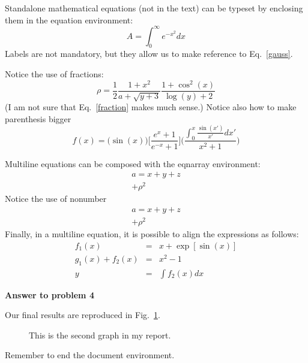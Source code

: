 \documentclass[12pt,dvips]{article}
\begin{document}
Standalone mathematical equations (not in the text) can be
typeset by enclosing them in the equation environment:
\begin{equation}
A = \int_0^\infty e^{-x^2} dx
\label{gauss}
\end{equation}
Labels are not mandatory, but they allow us to make reference
to Eq.~\ref{gauss}.

Notice the use of fractions:
\begin{equation}
\rho=\frac{1}{2} \frac{1+x^2}{a+\sqrt{y+3}} \frac{1+\cos^2(x)}{\log(y)+2} 
\label{fraction}
\end{equation}
(I am not sure that Eq.~\ref{fraction} makes much sense.)
Notice also how to make parenthesis bigger
\begin{equation}
f(x)=\big( \sin(x) \big) \Big[ \frac{e^x+1}{e^{-x}+1} \Big]
\Bigg( \frac{\int_0^x \frac{\sin(x')}{x'}dx'}{x^2+1} \Bigg) 
\label{big}
\end{equation}

Multiline equations can be composed with the eqnarray environment:
\begin{eqnarray}
a=x+y+z \\
+ \rho^2
\label{array1}
\end{eqnarray}
Notice the use of nonumber
\begin{eqnarray}
a=x+y+z \nonumber \\
+ \rho^2
\label{array2}
\end{eqnarray}
Finally, in a multiline equation, it is possible to align
the expressions as follows:
\begin{eqnarray}
f_1(x)&=&x+\exp[\sin(x)]  \\
g_1(x)+f_2(x)&=& x^2-1  \\
y &=& \int f_2(x) dx 
\label{multiline}
\end{eqnarray}

\bigskip
{\bf Answer to problem 4}
\bigskip

Our final results are reproduced in Fig.~\ref{pict2}. 
\begin{figure}[h!]
\begin{center}
\end{center}
\caption{\label{pict2}This is the second graph in my report.}
\end{figure}

Remember to end the document environment.
\end{document}
